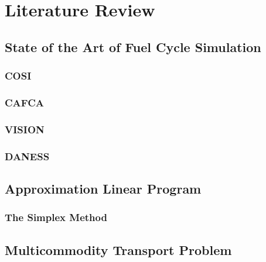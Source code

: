 \chapter{Literature Review}\label{ch:litreview}

\section{State of the Art of Fuel Cycle Simulation}\label{sec:simulators}


\subsection{COSI}\label{sec:cosi}


\subsection{CAFCA}\label{sec:cafca}


\subsection{VISION}\label{sec:vision}
%

\subsection{DANESS}\label{sec:daness}

\section{Approximation Linear Program}\label{sec:approx}

\subsection{The Simplex Method}

\section{Multicommodity Transport Problem}\label{sec:MCTP}

